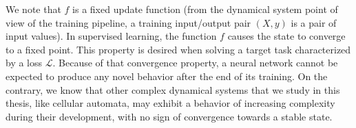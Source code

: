 We note that $f$ is a fixed update function (from the dynamical system point of
view of the training pipeline, a training input/output pair $(X, y)$ is a pair
of input values). In supervised learning, the function $f$ causes the state to
converge to a fixed point. This property is desired when solving a target task
characterized by a loss $\mathcal{L}$. Because of that convergence property, a neural
network cannot be expected to produce any novel behavior after the end of its
training. On the contrary, we know that other complex dynamical systems that we
study in this thesis, like cellular automata, may exhibit a behavior of increasing
complexity during their development, with no sign of convergence towards a
stable state.
